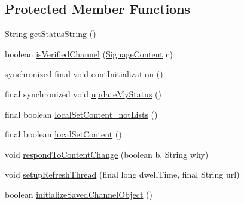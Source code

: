 \subsection*{Protected Member Functions}
\begin{DoxyCompactItemize}
\item 
String \hyperlink{classgov_1_1fnal_1_1ppd_1_1dd_1_1display_1_1client_1_1DisplayControllerMessagingAbstract_a2b1a875e536e8a8cdd816ce270809886}{get\-Status\-String} ()
\item 
boolean \hyperlink{classgov_1_1fnal_1_1ppd_1_1dd_1_1display_1_1client_1_1DisplayControllerMessagingAbstract_ad57efd600c98eb1c295d3cd6fe095ad4}{is\-Verified\-Channel} (\hyperlink{interfacegov_1_1fnal_1_1ppd_1_1dd_1_1signage_1_1SignageContent}{Signage\-Content} c)
\item 
synchronized final void \hyperlink{classgov_1_1fnal_1_1ppd_1_1dd_1_1display_1_1client_1_1DisplayControllerMessagingAbstract_a84ca1aeefd401a7d400e3bff94663830}{cont\-Initialization} ()
\item 
final synchronized void \hyperlink{classgov_1_1fnal_1_1ppd_1_1dd_1_1display_1_1client_1_1DisplayControllerMessagingAbstract_affb454bd94fc49410c790fece9c6cc52}{update\-My\-Status} ()
\item 
final boolean \hyperlink{classgov_1_1fnal_1_1ppd_1_1dd_1_1display_1_1client_1_1DisplayControllerMessagingAbstract_aabdab65eeec3892b41b7fc4d188838e8}{local\-Set\-Content\-\_\-not\-Lists} ()
\item 
final boolean \hyperlink{classgov_1_1fnal_1_1ppd_1_1dd_1_1display_1_1client_1_1DisplayControllerMessagingAbstract_a24673e152db1bddd9927cbc266059b99}{local\-Set\-Content} ()
\item 
void \hyperlink{classgov_1_1fnal_1_1ppd_1_1dd_1_1display_1_1client_1_1DisplayControllerMessagingAbstract_a00e51f2f72500d05345037e5f780dbda}{respond\-To\-Content\-Change} (boolean b, String why)
\item 
void \hyperlink{classgov_1_1fnal_1_1ppd_1_1dd_1_1display_1_1client_1_1DisplayControllerMessagingAbstract_a29b0a1677df18d26fdc7c5efb123baa5}{setup\-Refresh\-Thread} (final long dwell\-Time, final String url)
\item 
boolean \hyperlink{classgov_1_1fnal_1_1ppd_1_1dd_1_1display_1_1client_1_1DisplayControllerMessagingAbstract_add2c82077c4f12238773e4dfb2fd54aa}{initialize\-Saved\-Channel\-Object} ()
\end{DoxyCompactItemize}
